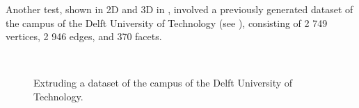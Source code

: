 Another test, shown in 2D and 3D in , involved a previously generated dataset of the campus of the Delft University of Technology (see \citet{Ledoux11a}), consisting of 2 749 vertices, 2 946 edges, and 370 facets.
\begin{figure}[tb]
\centering
{}
{}
\\
\caption{Extruding a dataset of the campus of the Delft University of Technology.}
\label{fig:campus}
\end{figure}
